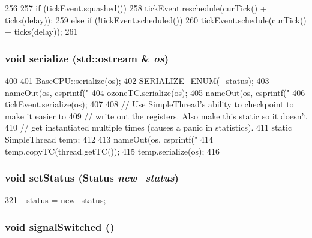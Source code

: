 \begin{DoxyCode}
256     {
257         if (tickEvent.squashed())
258             tickEvent.reschedule(curTick() + ticks(delay));
259         else if (!tickEvent.scheduled())
260             tickEvent.schedule(curTick() + ticks(delay));
261     }
\end{DoxyCode}
\hypertarget{classOzoneCPU_a53e036786d17361be4c7320d39c99b84}{
\subsubsection[{serialize}]{\setlength{\rightskip}{0pt plus 5cm}void serialize (std::ostream \& {\em os})}}
\label{classOzoneCPU_a53e036786d17361be4c7320d39c99b84}



\begin{DoxyCode}
400 {
401     BaseCPU::serialize(os);
402     SERIALIZE_ENUM(_status);
403     nameOut(os, csprintf("%
404     ozoneTC.serialize(os);
405     nameOut(os, csprintf("%
406     tickEvent.serialize(os);
407 
408     // Use SimpleThread's ability to checkpoint to make it easier to
409     // write out the registers.  Also make this static so it doesn't
410     // get instantiated multiple times (causes a panic in statistics).
411     static SimpleThread temp;
412 
413     nameOut(os, csprintf("%
414     temp.copyTC(thread.getTC());
415     temp.serialize(os);
416 }
\end{DoxyCode}
\hypertarget{classOzoneCPU_acdf331c877974ed8697216475a21998d}{
\subsubsection[{setStatus}]{\setlength{\rightskip}{0pt plus 5cm}void setStatus ({\bf Status} {\em new\_\-status})}}
\label{classOzoneCPU_acdf331c877974ed8697216475a21998d}



\begin{DoxyCode}
321 { _status = new_status; }
\end{DoxyCode}
\hypertarget{classOzoneCPU_a530eaaf1e3da16d4de8ec649914c8512}{
\subsubsection[{signalSwitched}]{\setlength{\rightskip}{0pt plus 5cm}void signalSwitched ()}}
\label{classOzoneCPU_a530eaaf1e3da16d4de8ec649914c8512}



